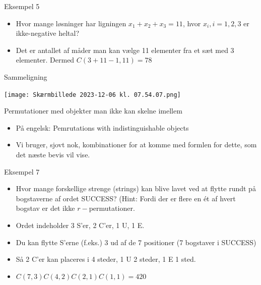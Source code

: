 \documentclass{beamer}
\begin{document}
\begin{frame}{Eksempel 5}
    \begin{itemize}
        \item<1-> Hvor mange løsninger har ligningen $x_1 + x_2 + x_3 = 11$, hvor $x_i, i = 1,2,3$ er ikke-negative heltal?
        \item<2-> Det er antallet af måder man kan vælge 11 elementer fra et sæt med 3 elementer. Dermed $C(3+11-1,11) = 78$
    \end{itemize}
\end{frame}

\begin{frame}{Sammeligning}
\begin{center}
\texttt{[image: Skærmbillede 2023-12-06 kl. 07.54.07.png]}
\end{center}
\end{frame}

\begin{frame}{Permutationer med objekter man ikke kan skelne imellem}
\begin{itemize}
    \item På engelsk: Pemrutations with indistinguishable objects
    \item Vi bruger, sjovt nok, kombinationer for at komme med formlen for dette, som det næste bevis vil vise.
\end{itemize}
\end{frame}

\begin{frame}{Eksempel 7}
   \begin{itemize}
       \item<1-> Hvor mange forskellige strenge (strings) kan blive lavet ved at flytte rundt på bogstaverne af ordet SUCCESS? (Hint: Fordi der er flere en ét af hvert bogstav er det ikke $r-$permutationer.
       \item<2-> Ordet indeholder 3 S'er, 2 C'er, 1 U, 1 E. 
       \item<3-> Du kan flytte S'erne (f.eks.) 3 ud af de 7 positioner (7 bogstaver i SUCCESS)
       \item<4-> Så 2 C'er kan placeres i 4 steder, 1 U 2 steder, 1 E 1 sted.
       \item<5-> $C(7,3)C(4,2)C(2,1)C(1,1) = 420$
   \end{itemize} 
\end{frame}
\end{document}
